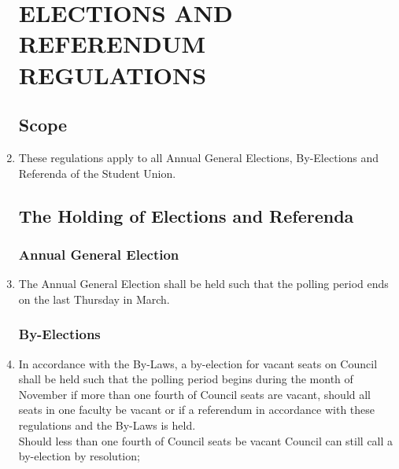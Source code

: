 \documentclass[oneside]{book}
\begin{document}
\begin{enumerate}
\part{\label{ELECTIONS_AND_REFERENDUM_REGULATIONS}ELECTIONS AND REFERENDUM
REGULATIONS }


\chapter{\label{Elections_Scope}Scope }
\item These regulations apply to all Annual General Elections, By-Elections
and Referenda of the Student Union. 

\chapter{\label{The_Holding_of_Elections_and_Referenda}The Holding of Elections
and Referenda }


\section{\label{Annual_General_Election}Annual General Election }
\item The Annual General Election shall be held such that the polling period
ends on the last Thursday in March. 

\section{\label{By-Elections}By-Elections }
\item In accordance with the By-Laws, a by-election for vacant seats on
Council shall be held such that the polling period begins during the
month of November if more than one fourth of Council seats are vacant,
should all seats in one faculty be vacant or if a referendum in accordance
with these regulations and the By-Laws is held. \\
Should less than one fourth of Council seats be vacant Council can
still call a by-election by resolution; 


\end{enumerate}
\end{document}
